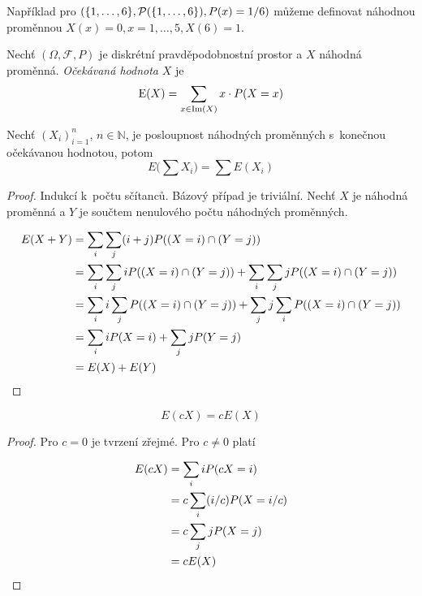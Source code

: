 \begin{example}
    Například pro
    $(\{1,\ldots,6\}, \mathcal{P}(\{1,\ldots,6\}), P(x) = 1/6)$
    můžeme definovat náhodnou proměnnou
    $X(x) = 0, x = 1,\ldots,5, X(6) = 1$.
\end{example}

\begin{definition}
    Nechť $(\Omega, \mathcal{F}, P)$ je diskrétní pravděpodobnostní
    prostor a $X$ náhodná proměnná. {\em Očekávaná hodnota} $X$
    je
    \[ \operatorname{E}(X) = \sum_{x \in \operatorname{Im}(X)} x \cdot P(X = x) \]
\end{definition}

\begin{theorem}
    Nechť $(X_i)_{i=1}^{n}$, $n \in \mathbb{N}$, je posloupnost
    náhodných proměnných \linebreak s~konečnou očekávanou hodnotou, potom
    \[
        E \big ( \sum X_i \big ) = \sum E(X_i)
    \]
\end{theorem}

\begin{proof}
    Indukcí k~počtu sčítanců. Bázový případ je triviální. Nechť $X$ je
    náhodná proměnná a $Y$ je součtem nenulového počtu náhodných proměnných.

    \begin{align*}
        E(X + Y) &= \sum_i \sum_j (i+j) P((X = i) \cap (Y = j)) \\
                 &= \sum_i \sum_j i P((X = i) \cap (Y = j))
                  + \sum_i \sum_j j P((X = i) \cap (Y = j)) \\
                 &= \sum_i i \sum_j P((X = i) \cap (Y = j))
                  + \sum_j j \sum_i P((X = i) \cap (Y = j)) \\
                 &= \sum_i i P(X = i)
                  + \sum_j j P(Y = j) \\
                 &= E(X) + E(Y)
                   \qedhere
    \end{align*}
\end{proof}

\pagebreak

\begin{theorem}
    \[
        E(cX) = cE(X)
    \]
\end{theorem}

\begin{proof}
    Pro $c = 0$ je tvrzení zřejmé. Pro $c \neq 0$ platí

    \begin{align*}
        E(cX) &=   \sum_i i P(cX = i) \\
              &= c \sum_i (i/c) P(X = i/c) \\
              &= c \sum_j j P(X = j) \\
              &= c E(X)
                \qedhere
    \end{align*}
\end{proof}

